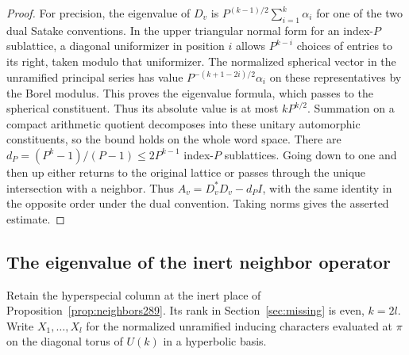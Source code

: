 \documentclass[a4paper,11pt]{article}
\theoremstyle{definition}
\theoremstyle{remark}
\numberwithin{equation}{section}
\begin{document}
\begin{proof}
For precision, the eigenvalue of \(D_v\) is
\(P^{(k-1)/2}\sum_{i=1}^k\alpha_i\) for one of the two dual
Satake conventions. In the upper triangular normal form
for an index-\(P\) sublattice, a diagonal uniformizer in
position \(i\) allows \(P^{k-i}\) choices of entries to
its right, taken modulo that uniformizer. The normalized
spherical vector in the unramified principal series has
value \(P^{-(k+1-2i)/2}\alpha_i\) on these representatives
by the Borel modulus. This proves the eigenvalue formula,
which passes to the spherical constituent.
Thus its absolute value is at most \(kP^{k/2}\).
Summation on a compact arithmetic quotient decomposes into
these unitary automorphic constituents, so the bound holds
on the whole word space. There are
\(d_P=(P^k-1)/(P-1)\le 2P^{k-1}\) index-\(P\) sublattices.
Going down to one and then up either returns to the original
lattice or passes through the unique intersection with a
neighbor. Thus \(A_v=D_v^*D_v-d_P I\), with the same
identity in the opposite order under the dual convention.
Taking norms gives the asserted estimate.
\end{proof}

\subsection{The eigenvalue of the inert neighbor operator}\label{nav:VIII-53}
Retain the hyperspecial column at the inert place of
Proposition~\ref{prop:neighbors289}. Its rank in Section~\ref{sec:missing}
is even, \(k=2l\). Write \(X_1,\ldots,X_l\) for the normalized
unramified inducing characters evaluated at \(\pi\) on the
diagonal torus of \(U(k)\) in a hyperbolic basis.
\end{document}
